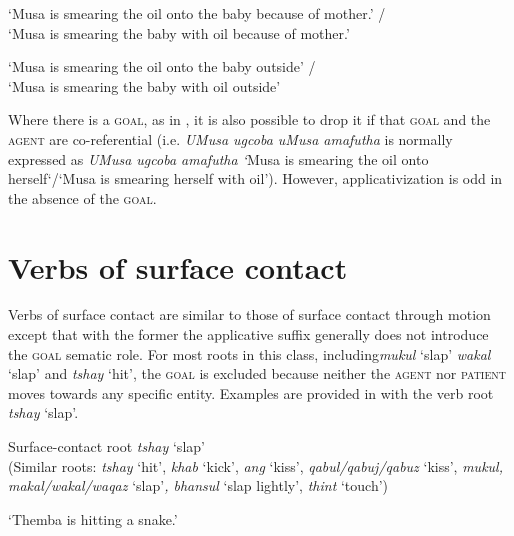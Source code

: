 \documentclass[output=paper]{langsci/langscibook}
\begin{document}
\glt ‘Musa is smearing the oil onto the baby because of mother.’ /\\
 ‘Musa is smearing the baby with oil because of mother.’


\glt ‘Musa is smearing the oil onto the baby outside’ / \\
‘Musa is smearing the baby with oil outside’ 
\z
\z

Where there is a \textsc{goal,} as in , it is also possible to drop it if that \textsc{goal} and the \textsc{agent} are co-referential (i.e. \textit{UMusa ugcoba uMusa amafutha} is normally expressed as \textit{UMusa ugcoba amafutha ‘}Musa is smearing the oil onto herself‘/‘Musa is smearing herself with oil’). However, applicativization is odd in the absence of the \textsc{goal.}

\section{Verbs of surface contact}\label{sec:sibanda:}

Verbs of surface contact are similar to those of surface contact through motion except that with the former the applicative suffix generally does not introduce the \textsc{goal} sematic role. For most roots in this class, including\textit {mukul} ‘slap’ \textit{wakal} ‘slap’ and \textit{tshay} ‘hit’, the \textsc{goal} is excluded because neither the \textsc{agent} nor \textsc{patient} moves towards any specific entity. Examples are provided in  with the verb root \textit{tshay} ‘slap’.

\ea\label{ex:sibanda:11}
\settowidth{}
{Surface-contact root \textit {tshay} ‘slap’} \\
 (Similar roots: \textit{tshay} ‘hit’, \textit{khab} ‘kick’, \textit{ang} ‘kiss’, \textit{qabul/qabuj/qabuz} ‘kiss’, \textit{mukul, makal/wakal/waqaz} ‘slap’\textit{, bhansul} ‘slap lightly’, \textit{thint} ‘touch’)\\

\glt ‘Themba is hitting a snake.’
\end{document}
